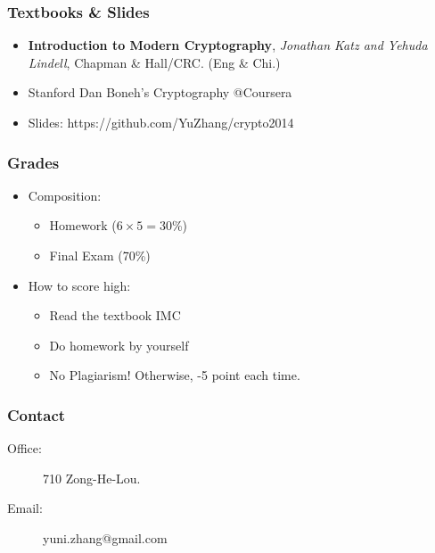 \begin{frame}\frametitle{Textbooks \& Slides}
\begin{itemize}
\item \textbf{Introduction to Modern Cryptography}, \emph{Jonathan Katz and Yehuda Lindell}, Chapman \& Hall/CRC. (Eng \& Chi.)
\item Stanford Dan Boneh's Cryptography @Coursera
\item Slides: https://github.com/YuZhang/crypto2014
\end{itemize}
\end{frame}
\begin{frame}\frametitle{Grades}
\begin{itemize}
\item Composition:
\begin{itemize}
\item Homework ($6 \times 5 = 30$\%)
\item Final Exam (70\%)
\end{itemize}
\item How to score high:
\begin{itemize}
\item Read the textbook IMC
\item Do homework by yourself
\item \alert{No Plagiarism!} Otherwise, -5 point each time. 
\end{itemize}
\end{itemize}
\end{frame}
\begin{frame}\frametitle{Contact}
\begin{description} 
\item[Office:] 710 Zong-He-Lou.
\item[Email:] yuni.zhang@gmail.com 
\end{description}
\end{frame}

